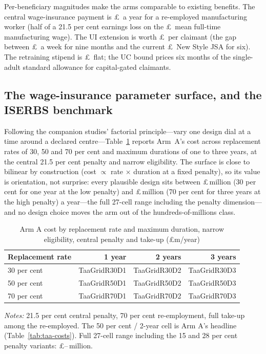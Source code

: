 Per-beneficiary magnitudes make the arms comparable to existing
benefits. The central wage-insurance payment is
\pounds\TaaWageInsPerWorkerCentralManuf\ a year for a re-employed
manufacturing worker (half of a 21.5 per cent earnings loss on the
\pounds\TaaMeanWeeklyManuf\ mean full-time manufacturing wage). The UI
extension is worth \pounds\TaaUiExtPerWorkerCentral\ per claimant (the
gap between \pounds\TaaUiWeekly\ a week for nine months and the current
\pounds\TaaJsaWeekly\ New Style JSA for six). The retraining stipend is
\pounds\TaaTrainPerWorker\ flat; the UC bound prices six months of the
single-adult standard allowance for capital-gated claimants.

\subsection{The wage-insurance parameter surface, and the ISERBS benchmark}\label{sec:results-grid}

Following the companion studies' factorial principle---vary one design
dial at a time around a declared centre---Table~\ref{tab:taa-grid}
reports Arm~A's cost across replacement rates of 30, 50 and 70 per cent
and maximum durations of one to three years, at the central 21.5 per
cent penalty and narrow eligibility. The surface is close to bilinear by
construction (cost $\propto$ rate $\times$ duration at a fixed penalty),
so its value is orientation, not surprise: every plausible design sits
between \pounds\TaaGridMin\,million (30 per cent for one year at the low
penalty) and \pounds\TaaGridMax\,million (70 per cent for three years at
the high penalty) a year---the full 27-cell range including the penalty
dimension---and no design choice moves the arm out of the
hundreds-of-millions class.

\begin{table}[htbp]
\centering
\caption{Arm A cost by replacement rate and maximum duration, narrow
eligibility, central penalty and take-up (\pounds m/year)}
\label{tab:taa-grid}
\small
\begin{tabular}{lrrr}
\toprule
Replacement rate & 1 year & 2 years & 3 years \\
\midrule
30 per cent & \csname TaaGridR30D1\endcsname & \csname TaaGridR30D2\endcsname & \csname TaaGridR30D3\endcsname \\
50 per cent & \csname TaaGridR50D1\endcsname & \csname TaaGridR50D2\endcsname & \csname TaaGridR50D3\endcsname \\
70 per cent & \csname TaaGridR70D1\endcsname & \csname TaaGridR70D2\endcsname & \csname TaaGridR70D3\endcsname \\
\bottomrule
\end{tabular}
\begin{minipage}{.8\textwidth}\footnotesize
\emph{Notes:} 21.5 per cent central penalty, 70 per cent re-employment,
full take-up among the re-employed. The 50 per cent / 2-year cell is Arm A's headline
(Table~\ref{tab:taa-costs}). Full 27-cell range including the 15 and 28
per cent penalty variants: \pounds\TaaGridMin--\TaaGridMax\,million.
\end{minipage}
\end{table}

